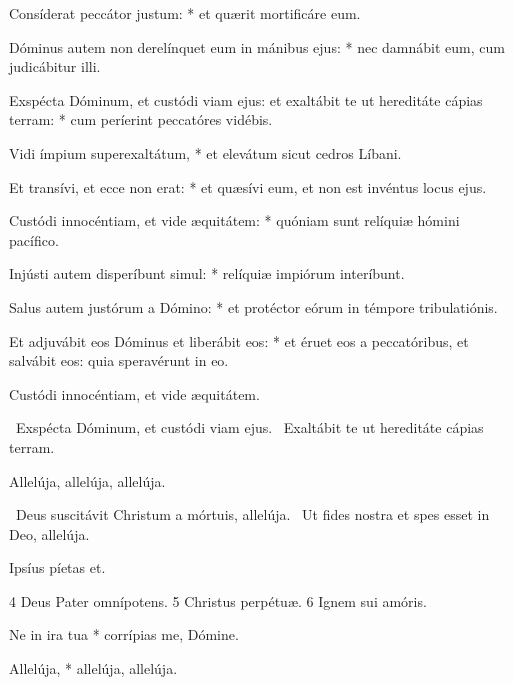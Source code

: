 Consíderat peccátor justum: * et quærit mortificáre eum.

Dóminus autem non derelínquet eum in mánibus ejus: * nec damnábit eum, cum judicábitur illi.

Exspécta Dóminum, et custódi viam ejus: et exaltábit te ut hereditáte cápias terram: * cum períerint peccatóres vidébis.

Vidi ímpium superexaltátum, * et elevátum sicut cedros Líbani.

Et transívi, et ecce non erat: * et quæsívi eum, et non est invéntus locus ejus.

Custódi innocéntiam, et vide æquitátem: * quóniam sunt relíquiæ hómini pacífico.

Injústi autem disperíbunt simul: * relíquiæ impiórum interíbunt.

Salus autem justórum a Dómino: * et protéctor eórum in témpore tribulatiónis.

Et adjuvábit eos Dóminus et liberábit eos: * et éruet eos a peccatóribus, et salvábit eos: quia speravérunt in eo.

 Custódi innocéntiam, et vide æquitátem.



\V\ Exspécta Dóminum, et custódi viam ejus. \R\ Exaltábit te ut hereditáte cápias terram.



 Allelúja, allelúja, allelúja.

\V\ Deus suscitávit Christum a mórtuis, allelúja. \R\ Ut fides nostra et spes esset in Deo, allelúja.

 Ipsíus píetas et.

 4 Deus Pater omnípotens. 5 Christus perpétuæ. 6 Ignem sui amóris.



 Ne in ira tua * corrípias me, Dómine.


 Allelúja, * allelúja, allelúja.


